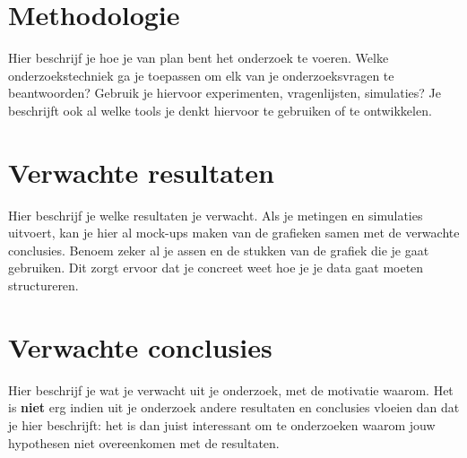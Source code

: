 \section{Methodologie}
\label{sec:methodologie}

Hier beschrijf je hoe je van plan bent het onderzoek te voeren. Welke onderzoekstechniek ga je toepassen om elk van je onderzoeksvragen te beantwoorden? Gebruik je hiervoor experimenten, vragenlijsten, simulaties? Je beschrijft ook al welke tools je denkt hiervoor te gebruiken of te ontwikkelen.

\section{Verwachte resultaten}
\label{sec:verwachte_resultaten}

Hier beschrijf je welke resultaten je verwacht. Als je metingen en simulaties uitvoert, kan je hier al mock-ups maken van de grafieken samen met de verwachte conclusies. Benoem zeker al je assen en de stukken van de grafiek die je gaat gebruiken. Dit zorgt ervoor dat je concreet weet hoe je je data gaat moeten structureren.

\section{Verwachte conclusies}
\label{sec:verwachte_conclusies}

Hier beschrijf je wat je verwacht uit je onderzoek, met de motivatie waarom. Het is \textbf{niet} erg indien uit je onderzoek andere resultaten en conclusies vloeien dan dat je hier beschrijft: het is dan juist interessant om te onderzoeken waarom jouw hypothesen niet overeenkomen met de resultaten.

